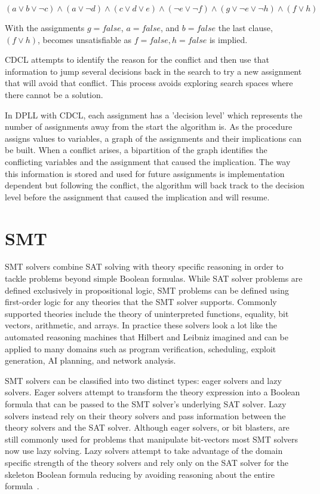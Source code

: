 \documentclass[]{final_report}
\begin{document}
$(a \lor b \lor \lnot c) \land (a \lor \lnot d) \land (c \lor d \lor e) \land (\lnot e \lor \lnot f ) \land (g \lor \lnot e \lor \lnot h) \land (f \lor h)$

With the assignments $g = \mathit{false}$, $a = \mathit{false}$, and $b = \mathit{false}$ the last clause, $ (f \lor h) $, becomes unsatisfiable as $ f = \mathit{false}, h = \mathit{false}$ is implied.

CDCL attempts to identify the reason for the conflict and then use that information to jump several decisions back in the search to try a new assignment that will avoid that conflict. This process avoids exploring search spaces where there cannot be a solution. 

In DPLL with CDCL, each assignment has a 'decision level' which represents the number of assignments away from the start the algorithm is. As the procedure assigns values to variables, a graph of the assignments and their implications can be built. When a conflict arises, a bipartition of the graph identifies the conflicting variables and the assignment that caused the implication. The way this information is stored and used for future assignments is implementation dependent but following the conflict, the algorithm will back track to the decision level before the assignment that caused the implication and will resume.

\section{SMT}

SMT solvers combine SAT solving with theory specific reasoning in order to tackle problems beyond simple Boolean formulas. While SAT solver problems are defined exclusively in propositional logic, SMT problems can be defined using first-order logic for any theories that the SMT solver supports. Commonly supported theories include the theory of uninterpreted functions, equality, bit vectors, arithmetic, and arrays. In practice these solvers look a lot like the automated reasoning machines that Hilbert and Leibniz imagined and can be applied to many domains such as program verification, scheduling, exploit generation, AI planning, and network analysis.

SMT solvers can be classified into two distinct types: eager solvers and lazy solvers. Eager solvers attempt to transform the theory expression into a Boolean formula that can be passed to the SMT solver's underlying SAT solver. Lazy solvers instead rely on their theory solvers and pass information between the theory solvers and the SAT solver. Although eager solvers, or bit blasters, are still commonly used for problems that manipulate bit-vectors most SMT solvers now use lazy solving. Lazy solvers attempt to take advantage of the domain specific strength of the theory solvers and rely only on the SAT solver for the skeleton Boolean formula reducing by avoiding reasoning about the entire formula~\cite{sattosmt, smtdpplt}.
\end{document}
